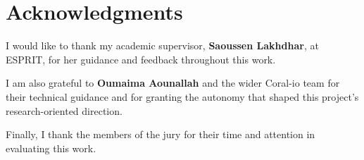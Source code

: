 \chapter*{Acknowledgments}

I would like to thank my academic supervisor, \textbf{Saoussen Lakhdhar}, at ESPRIT, for her guidance and feedback throughout this work.

I am also grateful to \textbf{Oumaima Aounallah} and the wider Coral-io team for their technical guidance and for granting the autonomy that shaped this project's research-oriented direction.

Finally, I thank the members of the jury for their time and attention in evaluating this work.

